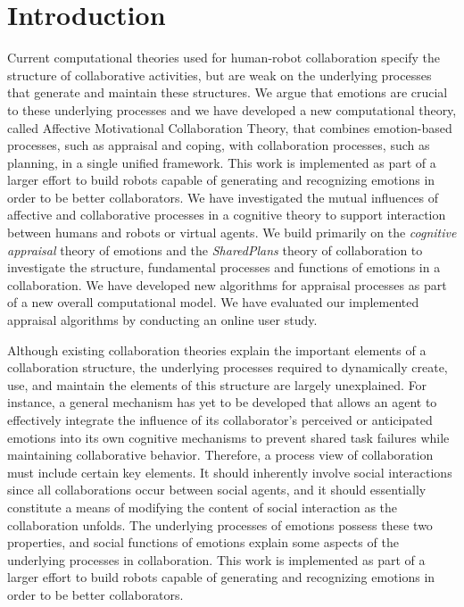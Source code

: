 \documentclass[12pt]{report}
\begin{document}
\section{Introduction}
Current computational theories used for human-robot collaboration specify the
structure of collaborative activities, but are weak on the underlying processes
that generate and maintain these structures. We argue that emotions are crucial
to these underlying processes and we have developed a new computational theory,
called Affective Motivational Collaboration Theory, that combines emotion-based
processes, such as appraisal and coping, with collaboration processes, such as
planning, in a single unified framework. This work is implemented as part of a
larger effort to build robots capable of generating and recognizing emotions in
order to be better collaborators. We have investigated the mutual influences of
affective and collaborative processes in a cognitive theory to support
interaction between humans and robots or virtual agents. We build primarily on
the \textit{cognitive appraisal} theory of emotions and the \textit{SharedPlans}
theory of collaboration to investigate the structure, fundamental processes and
functions of emotions in a collaboration. We have developed new algorithms for
appraisal processes as part of a new overall computational model. We have
evaluated our implemented appraisal algorithms by conducting an online user
study.

Although existing collaboration theories explain the important elements of a
collaboration structure, the underlying processes required to dynamically
create, use, and maintain the elements of this structure are largely
unexplained. For instance, a general mechanism has yet to be developed that
allows an agent to effectively integrate the influence of its collaborator's
perceived or anticipated emotions into its own cognitive mechanisms to prevent
shared task failures while maintaining collaborative behavior. Therefore, a
process view of collaboration must include certain key elements. It should
inherently involve social interactions since all collaborations occur between
social agents, and it should essentially constitute a means of modifying the
content of social interaction as the collaboration unfolds. The underlying
processes of emotions possess these two properties, and social functions of
emotions explain some aspects of the underlying processes in collaboration.
This work is implemented as part of a larger effort to build robots capable of
generating and recognizing emotions in order to be better collaborators.
\end{document}
